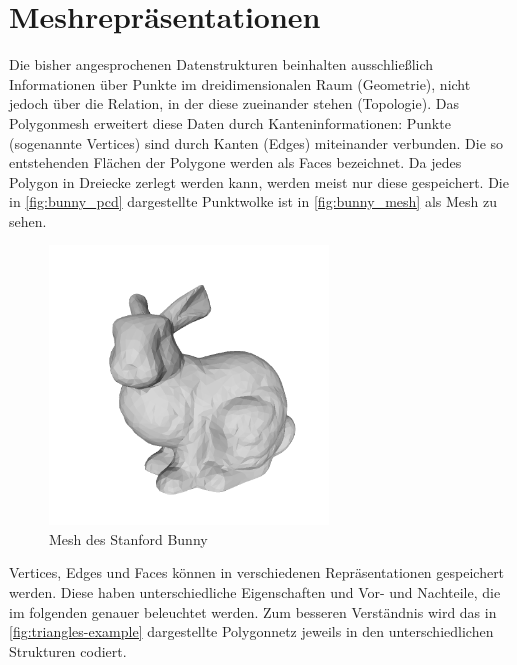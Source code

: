\section{Meshrepräsentationen}
\label{sec:meshrepr}

Die bisher angesprochenen Datenstrukturen beinhalten ausschließlich Informationen über Punkte im dreidimensionalen Raum (Geometrie), nicht jedoch über die Relation, in der diese zueinander stehen (Topologie).
Das Polygonmesh erweitert diese Daten durch Kanteninformationen: Punkte (sogenannte Vertices) sind durch Kanten (Edges) miteinander verbunden.
Die so entstehenden Flächen der Polygone werden als Faces bezeichnet.
Da jedes Polygon in Dreiecke zerlegt werden kann, werden meist nur diese gespeichert.
Die in \autoref{fig:bunny_pcd} dargestellte Punktwolke ist in \autoref{fig:bunny_mesh} als Mesh zu sehen.

\begin{figure}[H]
	\centering
	\includegraphics[width=0.66\textwidth, frame]{images/bunny_mesh.png}
	\caption{Mesh des Stanford Bunny \cite{stanfordbunny}}
	\label{fig:bunny_mesh}
\end{figure}

Vertices, Edges und Faces können in verschiedenen Repräsentationen gespeichert werden.
Diese haben unterschiedliche Eigenschaften und Vor- und Nachteile, die im folgenden genauer beleuchtet werden.
Zum besseren Verständnis wird das in \autoref{fig:triangles-example} dargestellte Polygonnetz jeweils in den unterschiedlichen Strukturen codiert.

